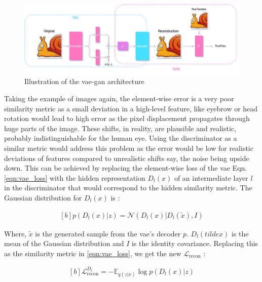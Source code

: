 \begin{figure}[!h]
    \centering
    \includegraphics[scale=0.15]{figures/arch/vae_gan_arch.png}
    \caption{Illustration of the \ac{vae}-\ac{gan} architecture}
    \label{fig:vae_gan_arch}
\end{figure}

Taking the example of images again, the element-wise error is a very poor similarity metric as a small deviation in a high-level feature, like eyebrow or head rotation would lead to high error as the pixel displacement propagates through huge parts of the image. These shifts, in reality, are plausible and realistic, probably indistinguishable for the human eye. Using the discriminator as a similar metric would address this problem as the error would be low for realistic deviations of features compared to unrealistic shifts say, the noise being upside down. This can be achieved by replacing the element-wise loss of the \ac{vae} Eqn. \ref{eqn:vae_loss} with the hidden representation $D_{l}(x)$ of an intermediate layer $l$ in the discriminator that would correspond to the hidden similarity metric. The Gaussian distribution for $D_{l}(x)$ is :
    
\begin{equation} \label{eqn:gan_similarity}
    \begin{aligned}[b]
        p\left(D_{l}(x) | z\right)=\mathcal{N}\left(D_{l}(x) | D_{l}(\tilde{x}), I\right)
    \end{aligned}
\end{equation}

Where, $\tilde{x}$ is the generated sample from the \ac{vae}'s decoder $p$. $D_{l}(tilde{x})$ is the mean of the Gaussian distribution and $I$ is the identity covariance. Replacing this as the similarity metric in \ref{eqn:vae_loss}, we get the new $\mathcal{L}_{\text {recon}}$ :

\begin{equation} \label{eqn:vaegan_recon}
    \begin{gathered}[b]
        \mathcal{L}_{\text {recon}}^{D_{l}}=-\mathbb{E}_{q(z | x)} \log p\left(D_{l}(x) | z\right)
    \end{gathered}
\end{equation}

